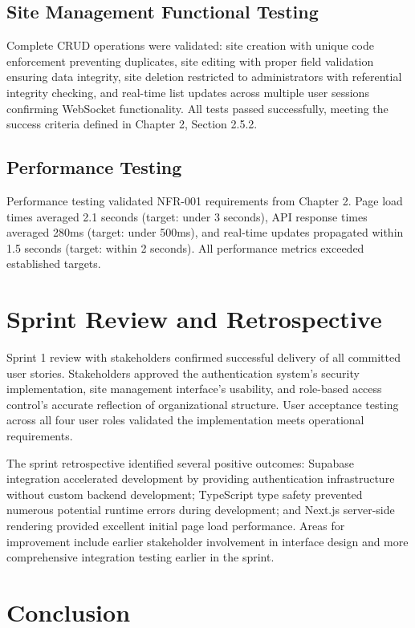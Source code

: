 \subsection{Site Management Functional Testing}

Complete CRUD operations were validated: site creation with unique code enforcement preventing duplicates, site editing with proper field validation ensuring data integrity, site deletion restricted to administrators with referential integrity checking, and real-time list updates across multiple user sessions confirming WebSocket functionality. All tests passed successfully, meeting the success criteria defined in Chapter 2, Section 2.5.2.

\subsection{Performance Testing}

Performance testing validated NFR-001 requirements from Chapter 2. Page load times averaged 2.1 seconds (target: under 3 seconds), API response times averaged 280ms (target: under 500ms), and real-time updates propagated within 1.5 seconds (target: within 2 seconds). All performance metrics exceeded established targets.

\section{Sprint Review and Retrospective}

Sprint 1 review with stakeholders confirmed successful delivery of all committed user stories. Stakeholders approved the authentication system's security implementation, site management interface's usability, and role-based access control's accurate reflection of organizational structure. User acceptance testing across all four user roles validated the implementation meets operational requirements.

The sprint retrospective identified several positive outcomes: Supabase integration accelerated development by providing authentication infrastructure without custom backend development; TypeScript type safety prevented numerous potential runtime errors during development; and Next.js server-side rendering provided excellent initial page load performance. Areas for improvement include earlier stakeholder involvement in interface design and more comprehensive integration testing earlier in the sprint.

\section{Conclusion}

